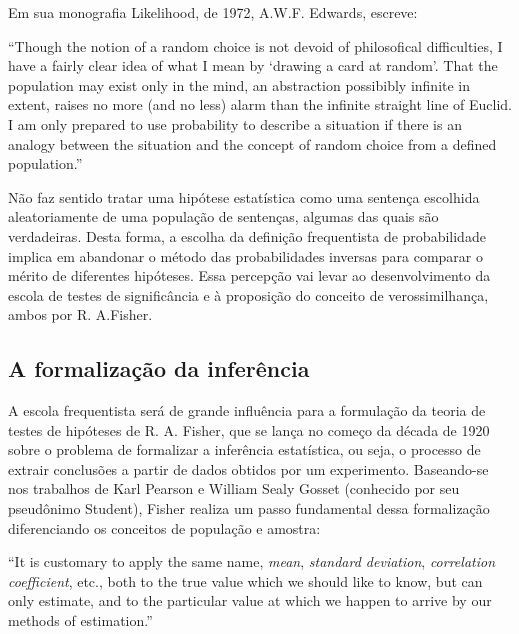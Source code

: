 \documentclass[12pt,a4paper]{article}
\begin{document}
Em sua monografia Likelihood, de 1972, A.W.F. Edwards, escreve:

``Though the notion of a random choice is not devoid of philosofical difficulties, I have a fairly clear idea of what I mean
by `drawing a card at random'. That the population may exist only in the mind, an abstraction possibibly infinite in extent,
raises no more (and no less) alarm than the infinite straight line of Euclid. I am only prepared to use probability to describe
a situation if there is an analogy between the situation and the concept of random choice from a defined population.''
\cite{Edwards72}

Não faz sentido tratar uma hipótese estatística como uma sentença escolhida aleatoriamente de uma população de sentenças, algumas
das quais são verdadeiras. Desta forma, a escolha da definição frequentista de probabilidade implica em abandonar o método
das probabilidades inversas para comparar o mérito de diferentes hipóteses. Essa percepção vai levar ao desenvolvimento
da escola de testes de significância e à proposição do conceito de verossimilhança, ambos por R. A.Fisher.

\subsection{A formalização da inferência}

A escola frequentista será de grande influência para a formulação da teoria de testes de hipóteses de R. A. Fisher, que se
lança no começo da década de 1920 sobre o problema de formalizar a inferência estatística, ou seja, o processo de
extrair conclusões a partir de dados obtidos por um experimento. Baseando-se nos trabalhos de Karl Pearson e William Sealy Gosset
(conhecido por seu pseudônimo Student), Fisher realiza um passo fundamental dessa formalização
diferenciando os conceitos de população e amostra:

``It is customary to apply the same name, {\em mean}, {\em standard deviation}, {\em correlation coefficient}, etc., both 
to the true value which we should like to know, but can only estimate, and to the particular value at which we happen 
to arrive by our methods of estimation.''\cite{Fisher1922}
\end{document}
